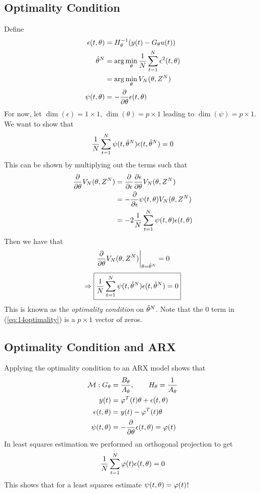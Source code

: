 \subsection{Optimality Condition}
Define
\begin{align*}
\epsilon(t,\theta) &= H_\theta^{-1}(y(t)-G_\theta u(t)) \\
\hat{\theta}^N &= \arg\min_\theta\frac{1}{N}\sum_{t=1}^N\epsilon^2(t,\theta) \\
&= \arg\min_\theta V_N(\theta,Z^N) \\
\psi(t,\theta) &= -\frac{\partial}{\partial\theta}\epsilon(t,\theta)
\end{align*}
For now, let $\dim(\epsilon)=1\times1$, $\dim(\theta)=p\times1$ leading to $\dim(\psi)=p\times1$. We want to show that
\begin{align*}
\frac{1}{N}\sum_{t=1}^N\psi(t,\hat{\theta}^N)\epsilon(t,\hat{\theta}^N) = 0
\end{align*}
This can be shown by multiplying out the terms such that
\begin{align*}
\frac{\partial}{\partial\theta}V_N(\theta,Z^N) &= \frac{\partial}{\partial\epsilon}\frac{\partial\epsilon}{\partial\theta}V_N(\theta,Z^N) \\
&= -\frac{\partial}{\partial\epsilon}\psi(t,\theta)V_N(\theta,Z^N) \\
&= -2\frac{1}{N}\sum_{t=1}^N\psi(t,\theta)\epsilon(t,\theta)
\end{align*}
Then we have that
\begin{align*}
\left.\frac{\partial}{\partial\theta}V_N(\theta,Z^N)\right|_{\theta=\hat{\theta}^N} = 0 \\
\end{align*}
\begin{align}
\label{eq:14optimality}
\Rightarrow \boxed{\frac{1}{N}\sum_{t=1}^N\psi(t,\hat{\theta}^N)\epsilon(t,\hat{\theta}^N) = 0}
\end{align}
This is known as the \textit{optimality condition} on $\hat{\theta}^N$. Note that the $0$ term in (\ref{eq:14optimality}) is a $p\times1$ vector of zeros.

\subsection{Optimality Condition and ARX}
Applying the optimality condition to an ARX model shows that
\begin{align*}
\mathcal{M}: G_\theta&=\frac{B_\theta}{A_\theta}, \qquad H_\theta=\frac{1}{A_\theta} \\
y(t)&= \varphi^T(t)\theta+\epsilon(t,\theta) \\
\epsilon(t,\theta) &= y(t)-\varphi^T(t)\theta \\
\psi(t,\theta) &= -\frac{\partial}{\partial\theta}\epsilon(t,\theta) = \varphi(t)
\end{align*}
In least squares estimation we performed an orthogonal projection to get
\begin{align*}
\frac{1}{N}\sum_{t=1}^N\varphi(t)\epsilon(t,\theta) = 0
\end{align*}
This shows that for a least squares estimate $\psi(t,\theta) = \varphi(t)$!

